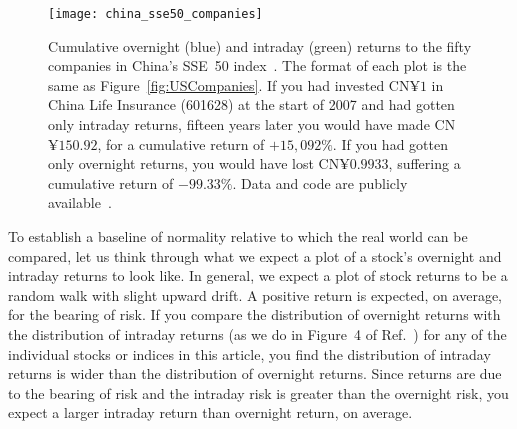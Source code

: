 \documentclass[twocolumn,twoside,prd,floatfix,letterpaper]{revtex4}
\newcommand{\ldds}[1]{#1}  %
\def \FigUSCompanies {Figure~\ref{fig:USCompanies}}
\begin{document}
\begin{figure*}[tp]
\texttt{[image: china\_sse50\_companies]}
\caption{\label{fig:ChinaCompanies}Cumulative overnight (blue) and intraday (green) returns to the fifty companies in China's SSE~50 index~\cite{ChinaSSE50Data}.  The format of each plot is the same as \FigUSCompanies.  If you had invested CN$\yen 1$ in China Life Insurance (601628) at the start of 2007 and had gotten only intraday returns, fifteen years later you would have made \ldds{CN$\yen 150.92$}, for a cumulative return of \ldds{$+15{,}092\%$}.  If you had gotten only overnight returns, you would have lost \ldds{CN$\yen 0.9933$}, suffering a cumulative return of \ldds{$-99.33\%$}.  Data and code are publicly available~\cite{yahooFinance,thisArticleWebpage}.}
\end{figure*}

To establish a baseline of normality relative to which the real world can be compared, let us think through what we expect a plot of a stock's overnight and intraday returns to look like.  In general, we expect a plot of stock returns to be a random walk with slight upward drift.  A positive return is expected, on average, for the bearing of risk.  If you compare the distribution of overnight returns with the distribution of intraday returns (as we do in Figure~4 of Ref.~\cite{knuteson2021}) for any of the individual stocks or indices in this article, you find the distribution of intraday returns is wider than the distribution of overnight returns.  Since returns are due to the bearing of risk and the intraday risk is greater than the overnight risk, you expect a larger intraday return than overnight return, on average.
\end{document}

